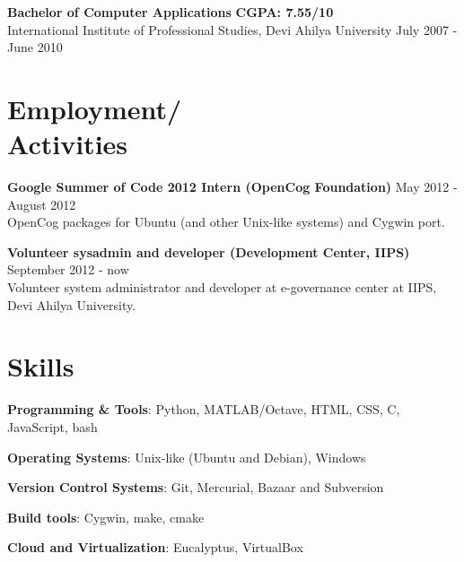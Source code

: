 \documentclass[margin,line]{resume}
\begin{document}
\begin{resume}
	\begin{list2}
	\item \textbf{Bachelor of Computer Applications} \hspace{70mm} \textbf{CGPA: 7.55/10} \\ International Institute of Professional Studies, Devi Ahilya University \hspace{20mm} July 2007 - June 2010
	\end{list2}

    \section{\mysidestyle Employment/ \\ Activities}

    \begin{list2}
	\item \textbf{Google Summer of Code 2012 Intern (OpenCog Foundation)} \hspace{15mm} May 2012 - August 2012 \\ OpenCog packages for Ubuntu (and other Unix-like systems) and Cygwin port.
	\item \textbf{Volunteer sysadmin and developer (Development Center, IIPS)} \hspace{12mm} September 2012 - now \\ Volunteer system administrator and developer at e-governance center at IIPS, Devi Ahilya University.
	\end{list2}

    \section{\mysidestyle Skills} 

    \begin{list2}
	\item \textbf{Programming \& Tools}: \hspace{8mm} Python, MATLAB/Octave, HTML, CSS, C, JavaScript, bash
	\item \textbf{Operating Systems}: \hspace{13.8mm} Unix-like (Ubuntu and Debian), Windows
	\item \textbf{Version Control Systems}: \hspace{3.5mm} Git, Mercurial, Bazaar and Subversion
	\item \textbf{Build tools}: \hspace{28mm} Cygwin, make, cmake
	\item \textbf{Cloud and Virtualization}: \hspace{3mm} Eucalyptus, VirtualBox
	\end{list2}


\end{resume}
\end{document}
